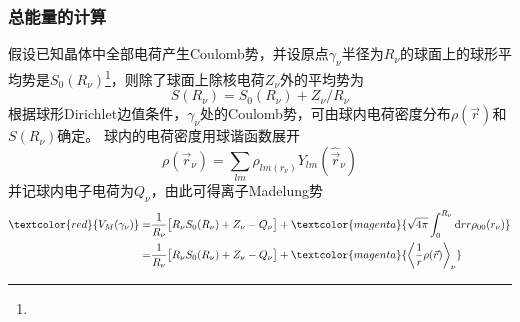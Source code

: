 {\frame
{
	\frametitle{总能量的计算}
	假设已知晶体中全部电荷产生\textrm{Coulomb}势，并设原点$\gamma_{\nu}$半径为$R_{\nu}$的球面上的球形平均势是$S_0(R_{\nu})$\footnote{\fontsize{7.2pt}{6.2pt}}，则除了球面上除核电荷$Z_{\nu}$外的平均势为
	\begin{displaymath}
		S(R_{\nu})=S_0(R_{\nu})+Z_{\nu}/R_{\nu}
	\end{displaymath}
	根据球形\textrm{Dirichlet}边值条件，$\gamma_{\nu}$处的\textrm{Coulomb}势，可由球内电荷密度分布$\rho(\vec r)$和$S(R_{\nu})$确定。
	球内的电荷密度用球谐函数展开
	\begin{displaymath}
		\rho(\vec r_{\nu})=\sum_{lm}\rho_{lm(r_{\nu})}Y_{lm}(\hat{\vec r}_{\nu})
	\end{displaymath}
	并记球内电子电荷为$Q_{\nu}$，由此可得离子\textrm{Madelung}势
	\begin{displaymath}
		\begin{aligned}
			\textcolor{red}{V_M(\gamma_{\nu})}=&\dfrac1{R_{\nu}}\big[R_{\nu}S_0(R_{\nu})+Z_{\nu}-Q_{\nu}\big]+\textcolor{magenta}{\sqrt{4\pi}\int_0^{R_{\nu}}\mathrm{d}rr\rho_{00}(r_{\nu})}\\
			=&\dfrac1{R_{\nu}}\big[R_{\nu}S_0(R_{\nu})+Z_{\nu}-Q_{\nu}\big]+\textcolor{magenta}{\left\langle\dfrac1r\rho(\vec r)\right\rangle_{\nu}}
		\end{aligned}
	\end{displaymath}
}

}
